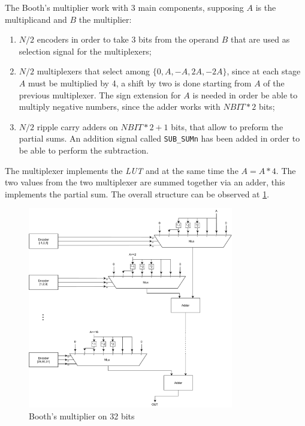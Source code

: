 The Booth's multiplier work with 3 main components, supposing $A$ is the multiplicand and $B$ the multiplier:
\begin{enumerate}
	\item $N/2$ encoders in order to take 3 bits from the operand $B$ that are used as selection signal for the multiplexers;
	\item $N/2$ multiplexers that select among $\{0, A, -A, 2A, -2A\}$, since at each stage $A$ must be multiplied by 4, a shift by two is done starting from $A$ of the previous multiplexer. The sign extension for $A$ is needed in order be able to multiply negative numbers, since the adder works with $NBIT*2$ bits;
	\item $N/2$ ripple carry adders on $NBIT*2 + 1$ bits, that allow to preform the partial sums. An addition signal called \texttt{SUB\_SUMn} has been added in order to be able to perform the subtraction.
\end{enumerate}
The multiplexer implements the \textit{LUT} and at the same time the $A = A * 4$. The two values from the two multiplexer are summed together via an adder, this implements the partial sum. The overall structure can be observed at \ref{fig:multiplier}.

\begin{figure}[ht]
	\centering
	\includegraphics[width=0.8\textwidth]{chapters/5_ExecuteStage/images/multiplier.pdf}
	\caption{Booth's multiplier on 32 bits}
	\label{fig:multiplier}
\end{figure}

	
